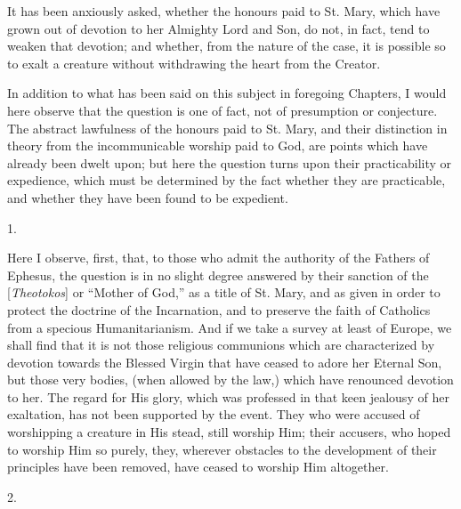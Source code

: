 
It has been anxiously asked, whether the honours paid to St. Mary,
which have grown out of devotion to her Almighty Lord and Son, do not,
in fact, tend to weaken that devotion; and whether, from the nature of
the case, it is possible so to exalt a creature without withdrawing
the heart from the Creator.

In addition to what has been said on this subject in foregoing
Chapters, I would here observe that the question is one of fact, not
of presumption or conjecture. The abstract lawfulness of the honours
paid to St. Mary, and their distinction in theory from the
incommunicable worship paid to God, are points which have already been
dwelt upon; but here the question turns upon their practicability or
expedience, which must be determined by the fact whether they are
practicable, and whether they have been found to be expedient.

1.

Here I observe, first, that, to those who admit the authority of
the Fathers of Ephesus, the question is in no slight degree answered
by their sanction of the [\emph{Theotokos}]
or ``Mother of God,'' as a title of St. Mary, and as given in
order to protect the doctrine of the Incarnation, and to preserve the
faith of Catholics from a specious Humanitarianism. And if we take a
survey at least of Europe, we shall find that it is not those
religious communions which are characterized by devotion towards the
Blessed Virgin that have ceased to adore her Eternal Son, but those
very bodies, (when allowed by the law,) which have renounced devotion
to her. The regard for His glory, which was professed in that keen
jealousy of her exaltation, has not been supported by the event. They
who were accused of worshipping a creature in His stead, still worship
Him; their accusers, who hoped to worship Him so purely, they,
wherever obstacles to the development of their principles have been
removed, have ceased to worship Him altogether.

2.

